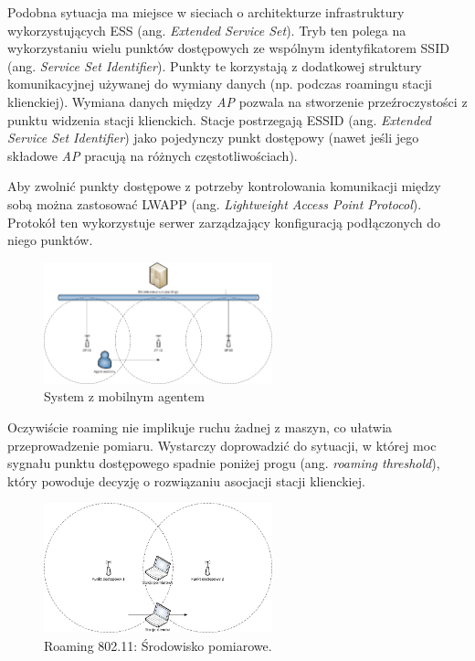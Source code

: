 Podobna sytuacja ma miejsce w sieciach o architekturze infrastruktury wykorzystujących ESS (ang. \emph{Extended Service Set}). Tryb ten polega na wykorzystaniu wielu punktów dostępowych ze wspólnym identyfikatorem SSID (ang. \emph{Service Set Identifier}). Punkty te korzystają z dodatkowej struktury komunikacyjnej używanej do wymiany danych (np. podczas roamingu stacji klienckiej). Wymiana danych między \emph{AP} pozwala na stworzenie przeźroczystości z punktu widzenia stacji klienckich. Stacje postrzegają ESSID (ang. \emph{Extended Service Set Identifier}) jako pojedynczy punkt dostępowy (nawet jeśli jego składowe \emph{AP} pracują na różnych częstotliwościach).

Aby zwolnić punkty dostępowe z potrzeby kontrolowania komunikacji między sobą można zastosować LWAPP (ang. \emph{Lightweight Access Point Protocol}). Protokół ten wykorzystuje serwer zarządzający konfiguracją podłączonych do niego punktów.

\begin{figure}[htb]
\begin{center}
\includegraphics[width=250px]{img/System_czasu_rzeczywistego}
\caption{System z mobilnym agentem}
\label{MobileAgentSystem}
\end{center}
\end{figure}

Oczywiście roaming nie implikuje ruchu żadnej z maszyn, co ułatwia przeprowadzenie pomiaru. Wystarczy doprowadzić do sytuacji, w której moc sygnału punktu dostępowego spadnie poniżej progu (ang. \emph{roaming threshold}), który powoduje decyzję o rozwiązaniu asocjacji stacji klienckiej. 

\begin{figure}[htb]
\begin{center}
\includegraphics[width=250px]{img/Roaming}
\caption{Roaming 802.11: Środowisko pomiarowe.}
\label{RoamingEnviroment}
\end{center}
\end{figure}

